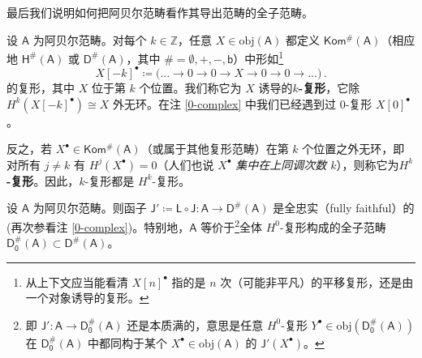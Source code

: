 
最后我们说明如何把阿贝尔范畴看作其导出范畴的全子范畴。

\begin{Def}
	设 $\mathsf{A}$ 为阿贝尔范畴。对每个 $k\in\mathbb{Z}$，任意 $X\in\text{obj}(\mathsf{A})$ 都定义 $\mathsf{Kom^\#\!(A)}$（相应地 $\mathsf{H^\#\!(A)}$ 或 $\mathsf{D^\#\!(A)}$，其中 $\#=\emptyset,+,-,\mathsf{b}$）中形如\footnote{从上下文应当能看清 $X[n]^\bullet$ 指的是 $n$ 次（可能非平凡）的平移复形，还是由一个对象诱导的复形。}
	\[
	X[-k]^\bullet\coloneqq\big(...\rightarrow 0\rightarrow 0\rightarrow X\rightarrow 0\rightarrow 0\rightarrow ...\big)\,.
	\]
	的复形，其中 $X$ 位于第 $k$ 个位置。我们称它为 $X$ 诱导的\textbf{$k$-复形}，它除 $H^k(X[-k]^\bullet)\cong X$ 外无环。在注 \ref{0-complex} 中我们已经遇到过 $0$-复形 $X[0]^\bullet$。
	
	反之，若 $X^\bullet\in\mathsf{Kom^\#\!(A)}$（或属于其他复形范畴）在第 $k$ 个位置之外无环，即对所有 $j\neq k$ 有 $H^j(X^\bullet)=0$（人们也说 $X^\bullet$ \textit{集中在上同调次数 $k$}），则称它为\textbf{$H^k$-复形}。因此，$k$-复形都是 $H^k$-复形。 
\end{Def}


\begin{Pro}\label{AinD(A)}
	设 $\mathsf{A}$ 为阿贝尔范畴。则函子 $\mathsf{J'}\coloneqq \mathsf{L\circ J}:\mathsf{A}\rightarrow\mathsf{D^\#\!(A)}$ 是全忠实（fully faithful）的\textup(再次参看注 \ref{0-complex}\textup)。特别地，$\mathsf{A}$ 等价于\footnote{即 $\mathsf{J'}:\mathsf{A}\rightarrow\mathsf{D_0^\#\!(A)}$ 还是本质满的，意思是任意 $H^0$-复形 $Y^\bullet\in\text{obj}(\mathsf{D_0^\#\!(A)})$ 在 $\mathsf{D_0^\#\!(A)}$ 中都同构于某个 $X^\bullet\in\text{obj}(\mathsf{A})$ 的 $\mathsf{J'}(X^\bullet)$。}全体 $H^0$-复形构成的全子范畴 $\mathsf{D_0^\#\!(A)}\subset\mathsf{D^\#\!(A)}$。
\end{Pro}


